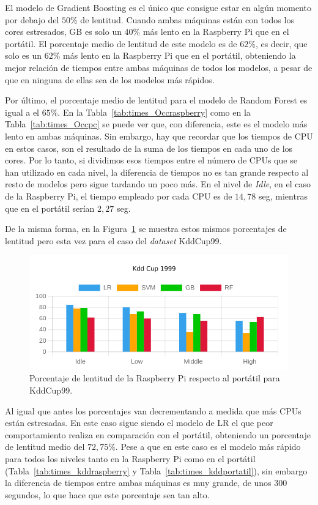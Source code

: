 \documentclass[a4paper, 12pt]{book}
\begin{document}
El modelo de Gradient Boosting es el único que consigue estar en algún momento por debajo del $50\%$ de lentitud. Cuando ambas máquinas están con todos los cores estresados, GB es solo un $40\%$ más lento en la Raspberry Pi que en el portátil. El porcentaje medio de lentitud de este modelo es de $62\%$, es decir, que solo es un $62\%$ más lento en la Raspberry Pi que en el portátil, obteniendo la mejor relación de tiempos entre ambas máquinas de todos los modelos, a pesar de que en ninguna de ellas sea de los modelos más rápidos.

Por último, el porcentaje medio de lentitud para el modelo de Random Forest es igual a el $65\%$. En la Tabla~\ref{tab:times_Occraspberry} como en la Tabla~\ref{tab:times_Occpc} se puede ver que, con diferencia, este es el modelo más lento en ambas máquinas. Sin embargo, hay que recordar que los tiempos de CPU en estos casos, son el resultado de la suma de los tiempos en cada uno de los cores. Por lo tanto, si dividimos esos tiempos entre el número de CPUs que se han utilizado en cada nivel, la diferencia de tiempos no es tan grande respecto al resto de modelos pero sigue tardando un poco más. En el nivel de \textit{Idle}, en el caso de la Raspberry Pi, el tiempo empleado por cada CPU es de $14,78$ seg, mientras que en el portátil serían $2,27$ seg.

De la misma forma, en la Figura~\ref{fig:per_kdd} se muestra estos mismos porcentajes de lentitud pero esta vez para el caso del \textit{dataset} KddCup99.

\begin{figure}[htb]
  \centering
  \includegraphics[width=14cm, keepaspectratio]{img/per_kdd.png}
  \caption{Porcentaje de lentitud de la Raspberry Pi respecto al portátil para KddCup99.}
  \label{fig:per_kdd}
\end{figure}

Al igual que antes los porcentajes van decrementando a medida que más CPUs están estresadas. En este caso sigue siendo el modelo de LR el que peor comportamiento realiza en comparación con el portátil, obteniendo un porcentaje de lentitud medio del $72,75\%$. Pese a que en este caso es el modelo más rápido para todos los niveles tanto en la Raspberry Pi como en el portátil (Tabla~\ref{tab:times_kddraspberry} y Tabla~\ref{tab:times_kddportatil}), sin embargo la diferencia de tiempos entre ambas máquinas es muy grande, de unos $300$ segundos, lo que hace que este porcentaje sea tan alto.
\end{document}
